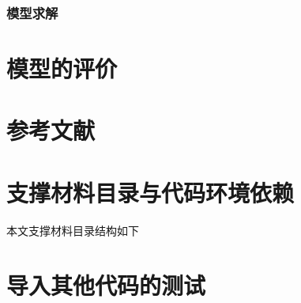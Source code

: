 \documentclass{../../../Template/cumcmthesis-2025} %
\begin{document}


\subsubsection{模型求解}


\section{模型的评价}



\section{参考文献}



\newpage
\nocite{*}



\newpage
\begin{appendices} %
\section{支撑材料目录与代码环境依赖}
本文支撑材料目录结构如下


\section{导入其他代码的测试}


\end{appendices}
\end{document}
